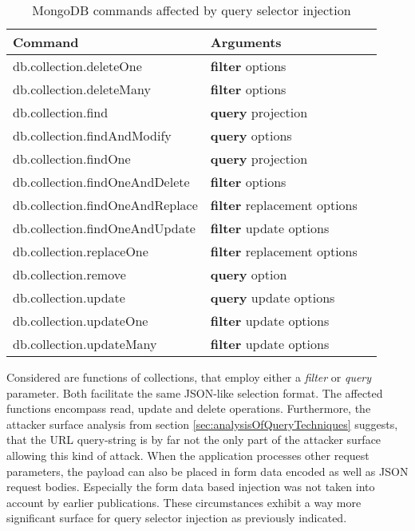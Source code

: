 \begin{table}[h]
 \sffamily
 \centering
 \begin{tabular}{lll}
  \textbf{Command} & \textbf{Arguments} \\ \hline
  db.collection.deleteOne         & \textbf{filter} options \\
  db.collection.deleteMany        & \textbf{filter} options \\
  db.collection.find              & \textbf{query} projection \\
  db.collection.findAndModify     & \textbf{query} options \\
  db.collection.findOne           & \textbf{query} projection \\
  db.collection.findOneAndDelete  & \textbf{filter} options \\
  db.collection.findOneAndReplace & \textbf{filter} replacement options \\
  db.collection.findOneAndUpdate  & \textbf{filter} update options \\
  db.collection.replaceOne        & \textbf{filter} replacement options \\
  db.collection.remove            & \textbf{query} option \\
  db.collection.update            & \textbf{query} update options \\
  db.collection.updateOne         & \textbf{filter} update options \\
  db.collection.updateMany        & \textbf{filter} update options \\
  \bottomrule 
 \end{tabular}
 \caption{MongoDB commands affected by query selector injection}
 \label{tab:mongo_commands_affected}
\end{table}

Considered are functions of collections, that employ either a \emph{filter} or \emph{query} parameter. Both facilitate the same JSON-like selection format. The affected functions encompass read, update and delete operations. Furthermore, the attacker surface analysis from section \ref{sec:analysisOfQueryTechniques} suggests, that the URL query-string is by far not the only part of the attacker surface allowing this kind of attack. When the application processes other request parameters, the payload can also be placed in form data encoded as well as JSON request bodies. Especially the form data based injection was not taken into account by earlier publications. These circumstances exhibit a way more significant surface for query selector injection as previously indicated. \\

